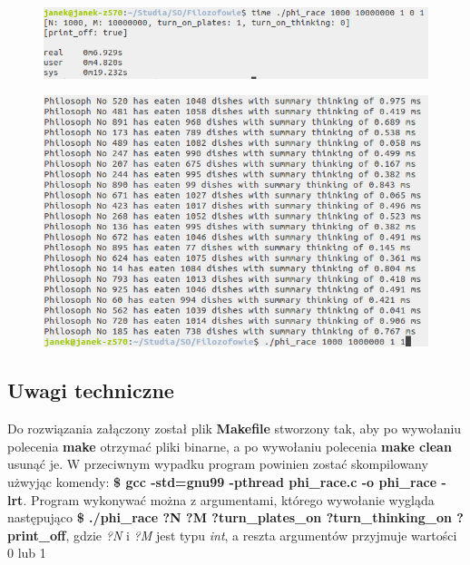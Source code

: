 \documentclass{article}
\begin{document}
\begin{figure}[h!]
\centering
\includegraphics[scale=0.4]{test_time2.png}
\end{figure} 

\begin{figure}[h!]
\centering
\includegraphics[scale=0.4]{test_bigtest.png}
\end{figure} 

\subsection*{Uwagi techniczne}

Do rozwiązania załączony został plik \textbf{Makefile} stworzony tak, aby po wywołaniu polecenia \textbf{make} otrzymać pliki binarne, a po wywołaniu polecenia \textbf{make clean} usunąć je. W przeciwnym wypadku program powinien zostać skompilowany użwyjąc komendy: \textbf{\$ gcc -std=gnu99 -pthread phi\_race.c -o phi\_race -lrt}. Program wykonywać można z argumentami, którego wywołanie wygląda następująco \textbf{\$ ./phi\_race ?N ?M ?turn\_plates\_on ?turn\_thinking\_on ?print\_off}, gdzie \emph{?N} i \emph{?M} jest typu \emph{int}, a reszta argumentów przyjmuje wartości 0 lub 1
\end{document}
